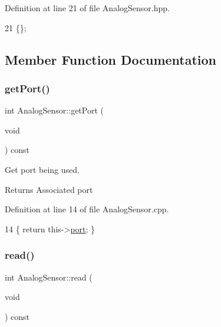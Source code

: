 Definition at line 21 of file Analog\+Sensor.\+hpp.


\begin{DoxyCode}
21 \{\};
\end{DoxyCode}


\subsection{Member Function Documentation}
\mbox{\label{class_analog_sensor_a21ce4f0e9917b0ab1a245c590b3ec7d7}} 
\subsubsection{\texorpdfstring{get\+Port()}{getPort()}}
{\footnotesize\ttfamily int Analog\+Sensor\+::get\+Port (\begin{DoxyParamCaption}\item[{void}]{ }\end{DoxyParamCaption}) const}



Get port being used. 

\begin{DoxyReturn}{Returns}
Associated port 
\end{DoxyReturn}


Definition at line 14 of file Analog\+Sensor.\+cpp.


\begin{DoxyCode}
14 \{ \textcolor{keywordflow}{return} this->\hyperlink{class_analog_sensor_a4897b9d41db1368ecc600a43547580f7}{port}; \}
\end{DoxyCode}
\mbox{\label{class_analog_sensor_ab3d8aa72dcadbdc023e6a55a49885eb8}} 
\subsubsection{\texorpdfstring{read()}{read()}}
{\footnotesize\ttfamily int Analog\+Sensor\+::read (\begin{DoxyParamCaption}\item[{void}]{ }\end{DoxyParamCaption}) const}



